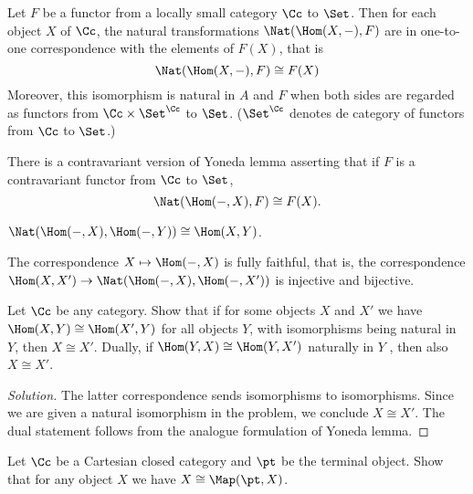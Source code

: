 \begin{lemma}
	Let $F$ be a functor from a locally small category $\Cc$ to $\Set$. Then for each object $X$ of $\Cc$, the natural transformations $\Nat(\Hom(X,-),F)$ are in one-to-one correspondence with the elements of $F(X)$, that is
	\[\Nat(\Hom(X,-), F)\cong F(X)\]
	Moreover, this isomorphism is natural in $A$ and $F$ when both sides are regarded as functors from $\Cc\times\Set^{\Cc}$ to $\Set$. ($\Set^{\Cc}$ denotes de category of functors from $\Cc$ to $\Set$.)
	
	There is a contravariant version of Yoneda lemma asserting that if $F$ is a contravariant functor from $\Cc$ to $\Set$,
	\[\Nat(\Hom(-,X), F)\cong F(X).\]
\end{lemma}
\begin{coro}
	$\Nat (\Hom(-,X),\Hom(-,Y))\cong\Hom(X,Y)$.
\end{coro}
\begin{remark}
	The correspondence $X\mapsto\Hom(-,X)$ is fully faithful, that is, the correspondence $\Hom(X,X')\to\Nat(\Hom(-,X),\Hom(-,X'))$ is injective and bijective.
\end{remark}
\begin{exercise}[a]
	Let $\Cc$ be any category. Show that if for some objects $X$ and $X'$ we have $\Hom(X, Y )\cong \Hom(X', Y )$ for all objects $Y$, with isomorphisms being natural in $Y$, then $X\cong X'$. Dually, if $\Hom(Y, X) \cong \Hom(Y, X')$ naturally in $Y$ , then also $X\cong X'$.
\end{exercise}
\begin{proof}[Solution]
	The latter correspondence sends isomorphisms to isomorphisms. Since we are given a natural isomorphism in the problem, we conclude $X\cong X'$. The dual statement follows from the analogue formulation of Yoneda lemma.
\end{proof}
\begin{exercise}[b]
	Let $\Cc$ be a Cartesian closed category and $\pt$ be the terminal object. Show that for any object $X$ we have $X\cong\Map(\pt,X)$.
\end{exercise}

